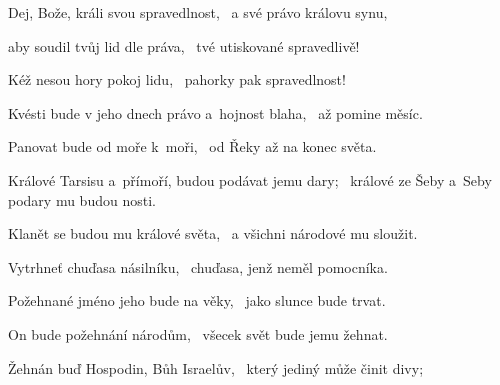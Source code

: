 \begin{psalmus}
 
Dej, Bože, králi svou spravedlnost,~\grestar{}
a své právo královu synu,~\Abardot{}

aby soudil tvůj lid dle práva,~\grestar{}
tvé utiskované spravedlivě!~\Abardot{}

Kéž nesou hory pokoj lidu,~\grestar{}
pahorky pak spravedlnost!~\Abardot{}

Kvésti bude v jeho dnech právo a~hojnost blaha,~\grestar{}
až pomine měsíc.~\Abardot{}

Panovat bude od moře k~moři,~\grestar{}
od Řeky až na konec světa.~\Abardot{}

Králové Tarsisu a~přímoří, budou podávat jemu dary;~\grestar{}
králové ze Šeby a~Seby podary mu budou nosti.~\Abardot{}

Klanět se budou mu králové světa,~\grestar{}
a všichni národové mu sloužit.~\Abardot{}

Vytrhneť chuďasa násilníku,~\grestar{}
chuďasa, jenž neměl pomocníka.~\Abardot{}

Požehnané jméno jeho bude na věky,~\grestar{}
jako slunce bude trvat.~\Abardot{}

On bude požehnání národům,~\grestar{}
všecek svět bude jemu žehnat.~\Abardot{}

Žehnán buď Hospodin, Bůh Israelův,~\grestar{}
který jediný může činit divy;~\Abardot{}
\end{psalmus}
